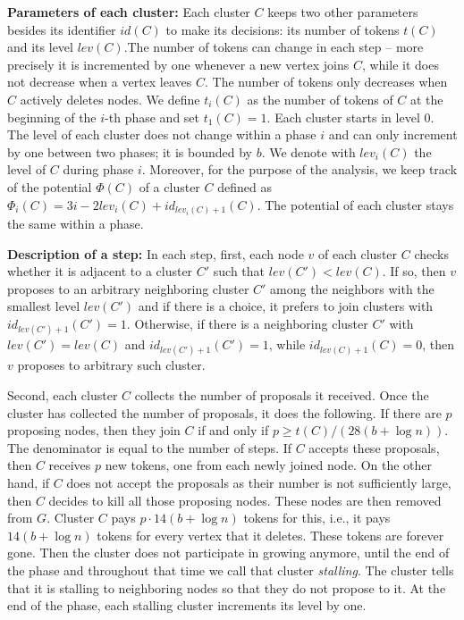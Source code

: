 \noindent\textbf{Parameters of each cluster:} Each cluster $C$ keeps two other parameters besides its identifier $id(C)$ to make its decisions:  its number of tokens $t(C)$ and its level $lev(C)$.The number of tokens can change in each step -- more precisely it is incremented by one whenever a new vertex joins $C$, while it does not decrease when a vertex leaves $C$.  The number of tokens only decreases when $C$ actively deletes nodes.  We define $t_i(C)$ as the number of tokens of $C$ at the beginning of the $i$-th phase and set $t_1(C) = 1$. Each  cluster  starts  in  level  $0$.   The  level  of  each cluster does not change within a phase $i$ and can only increment by one between two phases; it is bounded by $b$.  We denote with $lev_i(C)$ the level of $C$ during phase $i$.   Moreover,  for  the  purpose  of  the  analysis,  we  keep track  of  the  potential  $\Phi(C)$  of  a  cluster $C$ defined  as $\Phi_i(C) = 3i - 2lev_i(C) + id_{lev_i(C)+1}(C)$.  The potential of each cluster stays the same within a phase.

\noindent\textbf{Description  of  a  step:} In each step, first, each node $v$ of each cluster $C$ checks whether it is adjacent to a  cluster $C'$ such that  $lev(C')<lev(C)$. If  so, then $v$ proposes  to  an arbitrary  neighboring  cluster $C'$ among the neighbors with the smallest level $lev(C')$ and if there is a choice, it prefers to join clusters with $id_{lev(C')+1}(C') = 1$.  Otherwise, if there is a neighboring cluster $C'$ with $lev(C') = lev(C)$ and $id_{lev(C')+1}(C') = 1$, while  $id_{lev(C)+1}(C)  =  0$,  then $v$ proposes  to  arbitrary such cluster.

Second, each cluster $C$ collects the number of proposals  it  received.   Once  the  cluster  has  collected  the number  of  proposals,  it  does  the  following.   If  there are $p$ proposing nodes,  then they join $C$ if and only if $p \geq t(C)/(28(b+ \log n))$.  The denominator is equal to the number of steps. If $C$ accepts these proposals, then $C$ receives $p$ new tokens, one from each newly joined node. On the other hand, if $C$ does not accept the proposals as their number is not sufficiently large, then $C$ decides to kill all those proposing nodes.  These nodes are then removed from $G$.  Cluster $C$ pays $p \cdot 14(b+ \log n)$ tokens for this, i.e., it pays $14(b+ \log n)$ tokens for every vertex that it deletes.  These tokens are forever gone.  Then the cluster does not participate in growing anymore,  until the end of the phase and throughout that time we call that cluster \emph{stalling}.  The cluster tells that it is stalling to neighboring nodes so that they do not propose to it. At the end of the phase, each stalling cluster increments its level by one.


